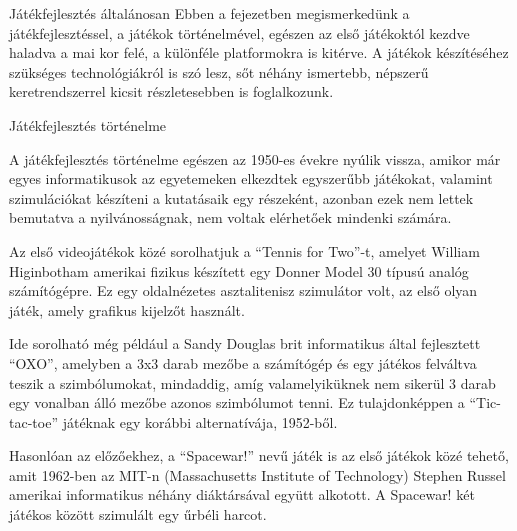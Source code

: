 \begin{MyChapter}{Játékfejlesztés általánosan}
	Ebben a fejezetben megismerkedünk a játékfejlesztéssel, a játékok történelmével, egészen az első játékoktól kezdve haladva a mai kor felé, a különféle platformokra is kitérve. A játékok készítéséhez szükséges technológiákról is szó lesz, sőt néhány ismertebb, népszerű keretrendszerrel kicsit részletesebben is foglalkozunk.

	\begin{MySection}{Játékfejlesztés történelme}
		
		A játékfejlesztés történelme egészen az 1950-es évekre nyúlik vissza, amikor már egyes informatikusok az egyetemeken elkezdtek egyszerűbb játékokat, valamint szimulációkat készíteni a kutatásaik egy részeként, azonban ezek nem lettek bemutatva a nyilvánosságnak, nem voltak elérhetőek mindenki számára.  
		
		Az első videojátékok közé sorolhatjuk a ``Tennis for Two''-t, amelyet William Higinbotham amerikai fizikus készített egy Donner Model 30 típusú analóg számítógépre. Ez egy oldalnézetes asztalitenisz szimulátor volt, az első olyan játék, amely grafikus kijelzőt használt.
		\cite{history.com_history_of_video_games}
		\cite{first_video_game}
		
		Ide sorolható még például a Sandy Douglas brit informatikus által fejlesztett ``OXO'', amelyben a 3x3 darab mezőbe a számítógép és egy játékos felváltva teszik a szimbólumokat, mindaddig, amíg valamelyiküknek nem sikerül 3 darab egy vonalban álló mezőbe azonos szimbólumot tenni. Ez tulajdonképpen a ``Tic-tac-toe'' játéknak egy korábbi alternatívája, 1952-ből.
		
		Hasonlóan az előzőekhez, a ``Spacewar!'' nevű játék is az első játékok közé tehető, amit 1962-ben az MIT-n (Massachusetts Institute of Technology) Stephen Russel amerikai informatikus néhány diáktársával együtt alkotott. A Spacewar! két játékos között szimulált egy űrbéli harcot.
		\cite{replay_book}
		\cite{spacewar}
		\cite{steve_russell}
		

\end{MySection}
\end{MyChapter}
